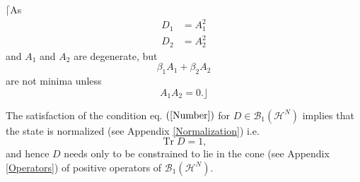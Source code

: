 \documentclass[aps,preprint]{revtex4}%
\begin{document}
$\lceil$As
\begin{align}
D_{1}  &  =A_{1}^{2}\\
D_{2}  &  =A_{2}^{2}%
\end{align}
and $A_{1}$ and $A_{2}$ are degenerate, but
\begin{equation}
\beta_{1}A_{1}+\beta_{2}A_{2}%
\end{equation}
are not minima unless
\begin{equation}
A_{1}A_{2}=0.\rfloor
\end{equation}


The satisfaction of the condition eq. $\left(  \ref{Number}\right)  $ for
$D\in\mathcal{B}_{1}\left(  \mathcal{H}^{N}\right)  $ implies that the state
is normalized (see Appendix \ref{Normalization}) i.e.
\begin{equation}
\operatorname{Tr}D=1,
\end{equation}
and hence $D$ needs only to be constrained to lie in the cone (see Appendix
\ref{Operators}) of positive operators of $\mathcal{B}_{1}\left(
\mathcal{H}^{N}\right)  $.
\end{document}
